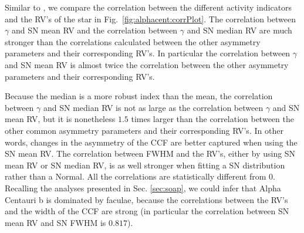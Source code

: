 \documentclass[11pt, oneside]{article}
\begin{document}
Similar to \citet{Figueira-2013}, we compare the correlation between the different activity indicators and the RV's of the star in Fig.~\ref{fig:alphacent:corrPlot}. The correlation between $\gamma$ and SN mean RV and the correlation between $\gamma$ and SN median RV are much stronger than the correlations calculated between the other asymmetry parameters and their corresponding RV's. In particular the correlation between $\gamma$ and SN mean RV is almost twice the correlation between the other asymmetry parameters and their corresponding RV's.

Because the median is a more robust index than the mean, the correlation between $\gamma$ and SN median RV is not as large as the correlation between $\gamma$ and SN mean RV, but it is nonetheless $1.5$ times larger than the correlation between the other common asymmetry parameters and their corresponding RV's. In other words, changes in the asymmetry of the CCF are better captured when using the SN mean RV. The correlation between FWHM and the RV's, either by using SN mean RV or SN median RV, is as well stronger when fitting a SN distribution rather than a Normal. All the correlations are statistically different from $0$. Recalling the analyses presented in Sec. \ref{sec:soap}, we could infer that Alpha Centauri b is dominated by faculae, because the correlations between the RV's and the width of the CCF are strong (in particular the correlation between SN mean RV and SN FWHM is $0.817$).
%
\end{document}
